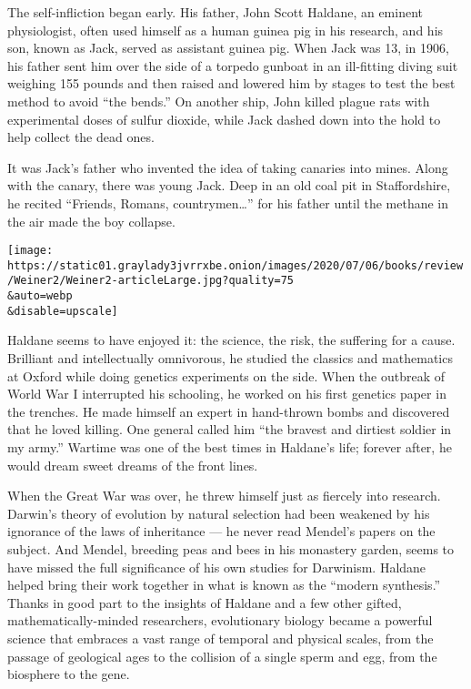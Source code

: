 The self-infliction began early. His father, John Scott Haldane, an
eminent physiologist, often used himself as a human guinea pig in his
research, and his son, known as Jack, served as assistant guinea pig.
When Jack was 13, in 1906, his father sent him over the side of a
torpedo gunboat in an ill-fitting diving suit weighing 155 pounds and
then raised and lowered him by stages to test the best method to avoid
``the bends.'' On another ship, John killed plague rats with
experimental doses of sulfur dioxide, while Jack dashed down into the
hold to help collect the dead ones.

It was Jack's father who invented the idea of taking canaries into
mines. Along with the canary, there was young Jack. Deep in an old coal
pit in Staffordshire, he recited ``Friends, Romans, countrymen\ldots{}''
for his father until the methane in the air made the boy collapse.

\texttt{[image: https://static01.graylady3jvrrxbe.onion/images/2020/07/06/books/review/Weiner2/Weiner2-articleLarge.jpg?quality=75\\\&auto=webp\\\&disable=upscale]}

Haldane seems to have enjoyed it: the science, the risk, the suffering
for a cause. Brilliant and intellectually omnivorous, he studied the
classics and mathematics at Oxford while doing genetics experiments on
the side. When the outbreak of World War I interrupted his schooling, he
worked on his first genetics paper in the trenches. He made himself an
expert in hand-thrown bombs and discovered that he loved killing. One
general called him ``the bravest and dirtiest soldier in my army.''
Wartime was one of the best times in Haldane's life; forever after, he
would dream sweet dreams of the front lines.

When the Great War was over, he threw himself just as fiercely into
research. Darwin's theory of evolution by natural selection had been
weakened by his ignorance of the laws of inheritance --- he never read
Mendel's papers on the subject. And Mendel, breeding peas and bees in
his monastery garden, seems to have missed the full significance of his
own studies for Darwinism. Haldane helped bring their work together in
what is known as the ``modern synthesis.'' Thanks in good part to the
insights of Haldane and a few other gifted, mathematically-minded
researchers, evolutionary biology became a powerful science that
embraces a vast range of temporal and physical scales, from the passage
of geological ages to the collision of a single sperm and egg, from the
biosphere to the gene.

